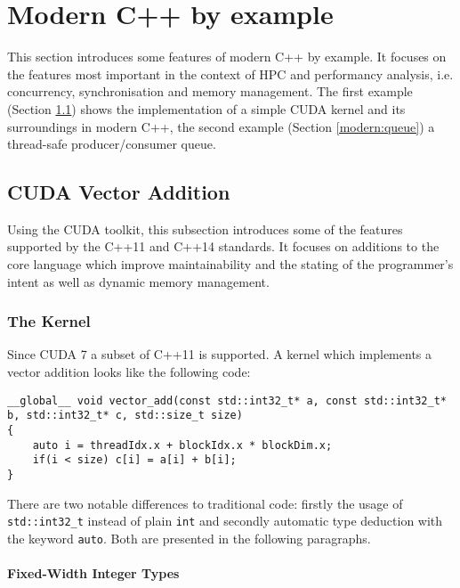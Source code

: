 \section{Modern C++ by example}\label{modern}

This section introduces some features of modern C++ by example. It focuses on the features most important in the context of HPC and performancy analysis, i.e. concurrency, synchronisation and memory management. The first example (Section \ref{modern:vec_add}) shows the implementation of a simple CUDA kernel and its surroundings in modern C++, the second example (Section \ref{modern:queue}) a thread-safe producer/consumer queue.

\subsection{CUDA Vector Addition}\label{modern:vec_add}

Using the CUDA toolkit, this subsection introduces some of the features supported by the C++11 and C++14 standards. It focuses on additions to the core language which improve maintainability and the stating of the programmer's intent as well as dynamic memory management.

\subsubsection{The Kernel}\label{modern:vec_add:kernel}

Since CUDA 7 a subset of C++11 is supported. A kernel which implements a vector addition looks like the following code:

\begin{verbatim}
__global__ void vector_add(const std::int32_t* a, const std::int32_t* b, std::int32_t* c, std::size_t size)
{
    auto i = threadIdx.x + blockIdx.x * blockDim.x;
    if(i < size) c[i] = a[i] + b[i];
}
\end{verbatim}

\noindent There are two notable differences to traditional code: firstly the usage of \texttt{std::int32\_t} instead of plain \texttt{int} and secondly automatic type deduction with the keyword \texttt{auto}. Both are presented in the following paragraphs.

\paragraph{Fixed-Width Integer Types}

